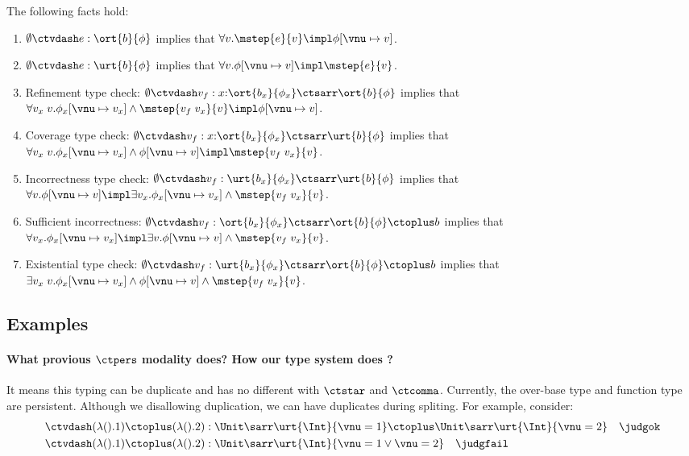 \begin{corollary} The following facts hold:
  \begin{enumerate}
    \item $\emptyset \ctvdash e : \ort{b}{\phi}$ implies that $\forall v. \mstep{e}{v} \impl \phi[\vnu \mapsto v]$.
    \item $\emptyset \ctvdash e : \urt{b}{\phi}$ implies that $\forall v. \phi[\vnu \mapsto v] \impl \mstep{e}{v}$.
    \item Refinement type check: $\emptyset \ctvdash v_f :  x{:}\ort{b_x}{\phi_x} \ctsarr \ort{b}{\phi}$ implies that $\forall v_x\;v. \phi_x[\vnu \mapsto v_x] \land \mstep{v_f\;v_x}{v} \impl \phi[\vnu \mapsto v]$.
    \item Coverage type check: $\emptyset \ctvdash v_f :  x{:}\ort{b_x}{\phi_x} \ctsarr \urt{b}{\phi}$ implies that $\forall v_x\;v. \phi_x[\vnu \mapsto v_x] \land \phi[\vnu \mapsto v]  \impl \mstep{v_f\;v_x}{v} $.
    \item Incorrectness type check: $\emptyset \ctvdash v_f : \urt{b_x}{\phi_x} \ctsarr \urt{b}{\phi}$ implies that \\ $\forall v. \phi[\vnu \mapsto v] \impl \exists v_x. \phi_x[\vnu \mapsto v_x] \land  \mstep{v_f\;v_x}{v} $.
    \item Sufficient incorrectness: $\emptyset \ctvdash v_f : \ort{b_x}{\phi_x} \ctsarr \ort{b}{\phi} \ctoplus b$ implies that \\ $\forall v_x. \phi_x[\vnu \mapsto v_x] \impl \exists v. \phi[\vnu \mapsto v] \land \mstep{v_f\;v_x}{v} $.
    \item Existential type check: $\emptyset \ctvdash v_f : \urt{b_x}{\phi_x} \ctsarr \ort{b}{\phi}\ctoplus b$ implies that \\ $\exists v_x\;v. \phi_x[\vnu \mapsto v_x] \land \phi[\vnu \mapsto v] \land \mstep{v_f\;v_x}{v} $.
  \end{enumerate}
\end{corollary}

\newpage
\subsection{Examples}

\paragraph{What provious $\ctpers$ modality does? How our type system does ?} It means this typing can be duplicate and has no different with $\ctstar$ and $\ctcomma$. Currently, the over-base type and function type are persistent. Although we disallowing duplication, we can have duplicates during spliting. For example, consider:
\begin{align*}
  &\ctvdash (\lambda ().1) \ctoplus (\lambda ().2) : \Unit \sarr \urt{\Int}{\vnu = 1} \ctoplus \Unit \sarr \urt{\Int}{\vnu = 2} \quad \judgok 
  \\&\ctvdash (\lambda ().1) \ctoplus (\lambda ().2) : \Unit \sarr \urt{\Int}{\vnu = 1 \lor \vnu = 2} \quad \judgfail
\end{align*}\noindent

